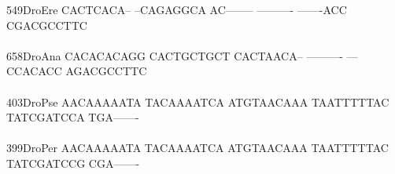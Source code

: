 \documentclass[11pt,twoside,reqno,a4paper]{article}
\begin{document}
{549\hspace*{2\charwidth}DroEre	CACTCACA--	--CAGAGGCA	AC--------	----------	-------ACC	CGACGCCTTC	\\
\hspace*{5\charwidth}\hspace*{7\charwidth}\hspace*{1\charwidth}\hspace*{1\charwidth}\hspace*{1\charwidth}\hspace*{1\charwidth}\hspace*{1\charwidth}\hspace*{1\charwidth}\\
658\hspace*{2\charwidth}DroAna	CACACACAGG	CACTGCTGCT	CACTAACA--	----------	---CCACACC	AGACGCCTTC	\\
\hspace*{5\charwidth}\hspace*{7\charwidth}\hspace*{1\charwidth}\hspace*{1\charwidth}\hspace*{1\charwidth}\hspace*{1\charwidth}\hspace*{1\charwidth}\hspace*{1\charwidth}\\
403\hspace*{2\charwidth}DroPse	AACAAAAATA	TACAAAATCA	ATGTAACAAA	TAATTTTTAC	TATCGATCCA	TGA-------	\\
\hspace*{5\charwidth}\hspace*{7\charwidth}\hspace*{1\charwidth}\hspace*{1\charwidth}\hspace*{1\charwidth}\hspace*{1\charwidth}\hspace*{1\charwidth}\hspace*{1\charwidth}\\
399\hspace*{2\charwidth}DroPer	AACAAAAATA	TACAAAATCA	ATGTAACAAA	TAATTTTTAC	TATCGATCCG	CGA-------	\\
\hspace*{5\charwidth}\hspace*{7\charwidth}\hspace*{1\charwidth}\hspace*{1\charwidth}\hspace*{1\charwidth}\hspace*{1\charwidth}\hspace*{1\charwidth}\hspace*{1\charwidth}\\
}
\end{document}
